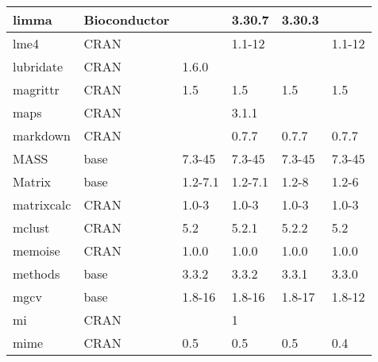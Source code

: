 \begin{longtable}{|llllll|}
limma                         & Bioconductor              &             & 3.30.7      & 3.30.3         &                  \\ \hline
lme4                          & CRAN                      &             & 1.1-12      &                & 1.1-12            \\ \hline \rowcolor{gray!25}
lubridate                     & CRAN                      & 1.6.0       &             &                &                  \\ \hline
magrittr                      & CRAN                      & 1.5         & 1.5         & 1.5            & 1.5               \\ \hline \rowcolor{gray!25}
maps                          & CRAN                      &             & 3.1.1       &                &                  \\ \hline
markdown                      & CRAN                      &             & 0.7.7       & 0.7.7          & 0.7.7             \\ \hline \rowcolor{gray!25}
MASS                          & base                      & 7.3-45      & 7.3-45      & 7.3-45         & 7.3-45           \\ \hline
Matrix                        & base                      & 1.2-7.1     & 1.2-7.1     & 1.2-8          & 1.2-6             \\ \hline \rowcolor{gray!25}
matrixcalc                    & CRAN                      & 1.0-3       & 1.0-3       & 1.0-3          & 1.0-3            \\ \hline
mclust                        & CRAN                      & 5.2         & 5.2.1       & 5.2.2          & 5.2               \\ \hline \rowcolor{gray!25}
memoise                       & CRAN                      & 1.0.0       & 1.0.0       & 1.0.0          & 1.0.0            \\ \hline
methods                       & base                      & 3.3.2       & 3.3.2       & 3.3.1          & 3.3.0             \\ \hline \rowcolor{gray!25}
mgcv                          & base                      & 1.8-16      & 1.8-16      & 1.8-17         & 1.8-12           \\ \hline
mi                            & CRAN                      &             & 1           &                &                   \\ \hline \rowcolor{gray!25}
mime                          & CRAN                      & 0.5         & 0.5         & 0.5            & 0.4              \\ \hline

\end{longtable}
